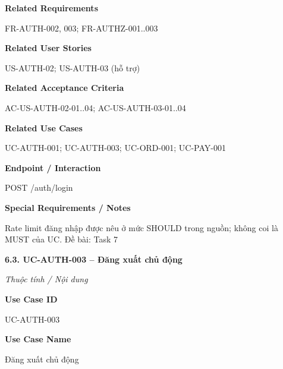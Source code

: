 \documentclass[11pt,a4paper,oneside]{report}
\begin{document}
\par\smallskip\noindent\textcolor{sgublue}{\textbf{Related Requirements}}\par\nobreak
FR-AUTH-002, 003; FR-AUTHZ-001..003
\par

\par\smallskip\noindent\textcolor{sgublue}{\textbf{Related User Stories}}\par\nobreak
US-AUTH-02; US-AUTH-03 (hỗ trợ)
\par

\par\smallskip\noindent\textcolor{sgublue}{\textbf{Related Acceptance Criteria}}\par\nobreak
AC-US-AUTH-02-01..04; AC-US-AUTH-03-01..04
\par

\par\smallskip\noindent\textcolor{sgublue}{\textbf{Related Use Cases}}\par\nobreak
UC-AUTH-001; UC-AUTH-003; UC-ORD-001; UC-PAY-001
\par

\par\smallskip\noindent\textcolor{sgublue}{\textbf{Endpoint / Interaction}}\par\nobreak
POST /auth/login
\par

\par\smallskip\noindent\textcolor{sgublue}{\textbf{Special Requirements / Notes}}\par\nobreak
Rate limit đăng nhập được nêu ở mức SHOULD trong nguồn; không coi là MUST của UC. \textbar{} Đề bài: Task 7
\par



\textbf{6.3. UC-AUTH-003 -- Đăng xuất chủ động}



\par\noindent\textit{Thuộc tính / Nội dung}\par

\par\smallskip\noindent\textcolor{sgublue}{\textbf{Use Case ID}}\par\nobreak
UC-AUTH-003
\par

\par\smallskip\noindent\textcolor{sgublue}{\textbf{Use Case Name}}\par\nobreak
Đăng xuất chủ động
\par
\end{document}

